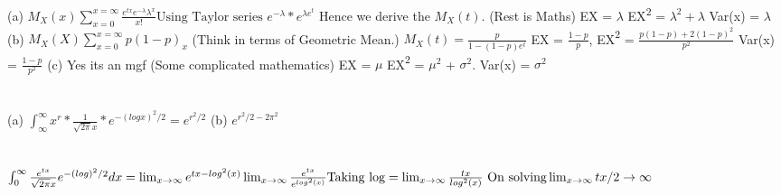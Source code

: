 \documentclass{report}
\begin{document}
\section{}
(a) {$M_{X}(x) \sum_{x=0}^{x=\infty}\frac{e^{tx}e^{-\lambda}\lambda^{x}}{x!} \text{Using Taylor series } e^{-\lambda} * e^{\lambda e^{t}} $} Hence we derive the {$M_{X}(t)$}. (Rest is Maths) EX = $\lambda$ EX{\textsuperscript{2}} = $\lambda^{2} + \lambda$ Var(x) = $\lambda$
{\newline}
(b) {$M_{X}(X) \sum_{x=0}^{x=\infty}p(1-p)_{x}$} (Think in terms of Geometric Mean.) {$M_{X}(t) = \frac{p}{1 - (1-p)e^{t}}$}
{\newline}
EX = $\frac{1-p}{p}$, EX{\textsuperscript{2}} = $\frac{p(1-p) + 2(1 - p )^{2}}{p^2}$ Var(x) = $\frac{1 - p}{p^2}$
{\newline}
(c) Yes its an mgf (Some complicated mathematics) EX = $\mu$  EX{\textsuperscript{2}} = {$\mu^{2}$} + {$\sigma^{2}$}. Var(x) = {$\sigma^{2}$} {\newline}

\section{}
(a) $\int_{\infty}^{\infty}x^{r} * \frac{1}{\sqrt{2\pi}x} * e^{-(log x)^{2}/2} = e^{r^{2}/2}$
{\newline}
(b) $e^{r^2/2 - 2\pi^{2}}$
{\newline}

\section{}
{$\int_{0}^{\infty} \frac{e^{tx}}{\sqrt{2\pi}x}e^{-(log)^2/2}dx 
\newline = \lim_{x \rightarrow \infty}e^{tx - log^{2}(x)} \newline \lim_{x \rightarrow \infty}\frac{e^{tx}}{e^{log^2(x)}} \text{Taking log} \newline = \lim_{x \rightarrow \infty}\frac{tx}{log^2(x)} \text{    On solving} \lim_{x \rightarrow \infty}tx/2 \rightarrow \infty $}
{\newline}
\end{document}
